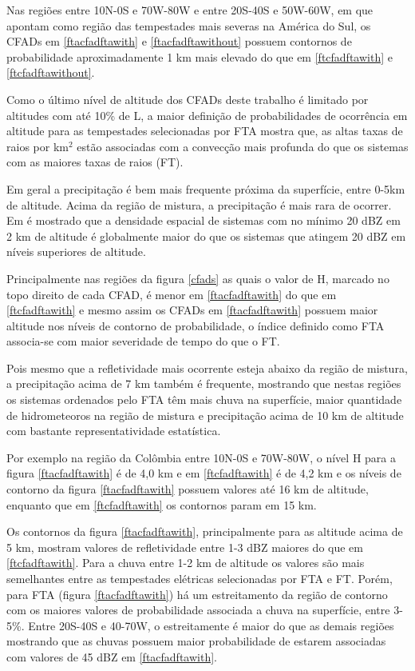 Nas regiões entre 10N-0S e 70W-80W e entre 20S-40S e 50W-60W, em que \cite{cecil2005} apontam como região das tempestades mais severas na América do Sul, os CFADs em \ref{ftacfadftawith} e \ref{ftacfadftawithout} possuem contornos de probabilidade aproximadamente 1 km mais elevado do que em \ref{ftcfadftawith} e \ref{ftcfadftawithout}.

Como o último nível de altitude dos CFADs deste trabalho é limitado por altitudes com até 10\% de L, a maior definição de probabilidades de ocorrência em altitude para as tempestades selecionadas por FTA mostra que, as altas taxas de raios por km$^2$ estão associadas com a convecção mais profunda do que os sistemas com as maiores taxas de raios (FT).

Em geral a precipitação é bem mais frequente próxima da superfície, entre 0-5km de altitude. Acima da região de mistura, a precipitação é mais rara de ocorrer. Em \cite{liu2008} é mostrado que a densidade espacial de sistemas com no mínimo 20 dBZ em 2 km de altitude é globalmente maior do que os sistemas que atingem 20 dBZ em níveis superiores de altitude.

Principalmente nas regiões da figura \ref{cfads} as quais o valor de H, marcado no topo direito de cada CFAD, é menor em \ref{ftacfadftawith} do que em \ref{ftcfadftawith} e mesmo assim os CFADs em \ref{ftacfadftawith} possuem maior altitude nos níveis de contorno de probabilidade, o índice definido como FTA associa-se com maior severidade de tempo do que o FT. 

Pois mesmo que a refletividade mais ocorrente esteja abaixo da região de mistura, a precipitação acima de 7 km também é frequente, mostrando que nestas regiões os sistemas ordenados pelo FTA têm mais chuva na superfície, maior quantidade de hidrometeoros na região de mistura e precipitação acima de 10 km de altitude com bastante representatividade estatística.

Por exemplo na região da Colômbia entre 10N-0S e 70W-80W, o nível H para a figura \ref{ftacfadftawith} é de 4,0 km e em \ref{ftcfadftawith} é de 4,2 km e os níveis de contorno da figura \ref{ftacfadftawith} possuem valores até 16 km de altitude, enquanto que em \ref{ftcfadftawith} os contornos param em 15 km. 

Os contornos da figura \ref{ftacfadftawith}, principalmente para as altitude acima de 5 km, mostram valores de refletividade entre 1-3 dBZ  maiores do que em \ref{ftcfadftawith}. Para a chuva entre 1-2 km de altitude os valores são mais semelhantes entre as tempestades elétricas selecionadas por FTA e FT. Porém, para FTA (figura \ref{ftacfadftawith}) há um estreitamento da região de contorno com os maiores valores de probabilidade associada a chuva na superfície, entre 3-5\%. Entre 20S-40S e 40-70W, o estreitamente é maior do que as demais regiões mostrando que as chuvas possuem maior probabilidade de estarem associadas com valores de 45 dBZ em \ref{ftacfadftawith}.      

